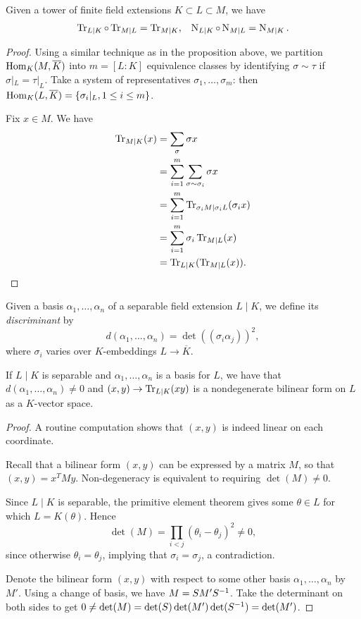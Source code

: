 \begin{corollary}
	Given a tower of finite field extensions $K\subset L\subset M$, we have
	\begin{align*}
		\operatorname{Tr}_{L\mid K} \circ \operatorname{Tr}_{M\mid L} = \operatorname{Tr}_{M\mid K}, & & \operatorname{N}_{L\mid K} \circ \operatorname{N}_{M\mid L} = \operatorname{N}_{M\mid K}.
	\end{align*}
\end{corollary}
\begin{proof}
	Using a similar technique as in the proposition above, we partition $\text{Hom}_K(M,\overline{K})$ into $m=[L:K]$ equivalence classes by identifying $\sigma\sim\tau$ if $\sigma|_L = \tau|_L$. Take a system of representatives $\sigma_1,\dots,\sigma_m$: then $\text{Hom}_K(L,\overline{K}) = \{\sigma_i|_L , 1\leq i \leq m\}$.

	Fix $x\in M$. We have
	\begin{align*}
		\operatorname{Tr}_{M\mid K}(x) &= \sum_\sigma \sigma x\\
			&= \sum_{i=1}^m \sum_{\sigma\sim\sigma_i} \sigma x\\
			&= \sum_{i=1}^m \operatorname{Tr}_{\sigma_i M\mid \sigma_i L}(\sigma_i x)\\
			&= \sum_{i=1}^m \sigma_i \operatorname{Tr}_{M\mid L}(x)\\
			&= \operatorname{Tr}_{L\mid K}(\operatorname{Tr}_{M\mid L}(x)).
	\end{align*}

\end{proof}


Given a basis $\alpha_1,\dots,\alpha_n$ of a separable field extension $L\mid K$, we define its \emph{discriminant} by
\[
	d(\alpha_1,\dots,\alpha_n) = \det((\sigma_i\alpha_j))^2,
\]
where $\sigma_i$ varies over $K$-embeddings $L\to\overline{K}$.


\begin{proposition}
	If $L\mid K$ is separable and $\alpha_1,\dots,\alpha_n$ is a basis for $L$, we have that $d(\alpha_1,\dots,\alpha_n)\neq 0$ and $(x,y) \to \operatorname{Tr}_{L\mid K}(xy)$ is a nondegenerate bilinear form on $L$ as a $K$-vector space.
\end{proposition}
\begin{proof}
	A routine computation shows that $(x,y)$ is indeed linear on each coordinate.

	Recall that a bilinear form $(x,y)$ can be expressed by a matrix $M$, so that $(x,y) = x^T M y$. Non-degeneracy is equivalent to requiring $\det(M)\neq 0$.
	
	Since $L\mid K$ is separable, the primitive element theorem gives some $\theta\in L$ for which $L=K(\theta)$. Hence
	\[
		\det(M) = \prod_{i<j}(\theta_i-\theta_j)^2 \neq 0,
	\]
	since otherwise $\theta_i = \theta_j$, implying that $\sigma_i=\sigma_j$, a contradiction.

	Denote the bilinear form $(x,y)$ with respect to some other basis $\alpha_1,\dots,\alpha_n$ by $M'$. Using a change of basis, we have $M=SM'S^{-1}$. Take the determinant on both sides to get $0\neq\det(M)=\det(S)\det(M')\det(S^{-1})=\det(M')$.
\end{proof}



